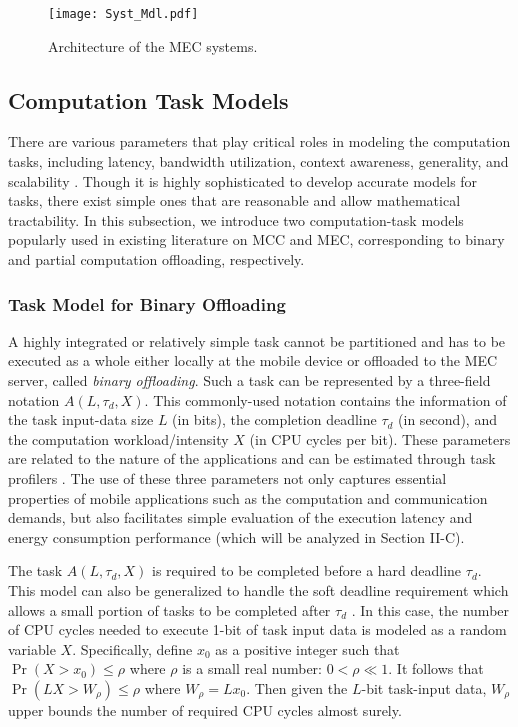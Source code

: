 \documentclass[journal]{IEEEtran}
\begin{document}
\begin{figure*}[!t]
\begin{center}
   \texttt{[image: Syst\_Mdl.pdf]}
\end{center}
\caption{Architecture of the MEC systems.}
\label{Syst_Mdl}
\end{figure*}


\subsection{Computation Task Models}

There are various parameters that play critical roles in modeling the computation tasks, including latency, bandwidth utilization, context awareness, generality, and scalability \cite{KhanAppModels}.  Though it is highly sophisticated to develop accurate models for tasks, there exist simple ones that are  reasonable and allow  mathematical tractability. In  this subsection, we introduce two computation-task models  popularly  used in existing literature on MCC and MEC, corresponding to  binary and partial computation offloading, respectively.

\subsubsection{\textbf{Task Model for Binary Offloading}}
A highly integrated or relatively simple task cannot be partitioned and has to be executed as a whole either  locally at  the mobile device or offloaded to the MEC server, called \emph{binary offloading}. Such a task can be  represented by a three-field notation $A\left(L,\tau_d,X\right)$. This commonly-used notation contains the information of the task input-data size $L$ (in bits), the completion deadline $\tau_{d}$ (in second), and the computation workload/intensity $X$ (in CPU cycles per bit). These parameters are related to the nature of the applications and can be estimated through  task profilers \cite{MiettinenHotCloud1006,SMelendez16}. The use of these three parameters not only captures essential properties of  mobile applications such as the computation and communication demands, but also facilitates simple evaluation of the execution latency and energy consumption performance (which will be analyzed in Section II-C).

The task $A\left(L,\tau_d,X\right)$ is required to be completed before a hard deadline $\tau_d$. This model can also be generalized to handle  the soft deadline requirement which allows a small portion of tasks to be completed after $\tau_d$ \cite{WYuan0310}. In this case, the number of CPU cycles needed to execute 1-bit of task input data is modeled as a random variable $X$. Specifically, define $x_0$ as a positive integer such that $\Pr(X >x _0) \leq \rho$ where $\rho$ is a small real number: $0 < \rho \ll 1$. It follows that $\Pr(LX > W_{\rho})\leq \rho$ where $W_{\rho} = L x_0$. Then given the $L$-bit task-input data, $W_{\rho}$ upper bounds the number of required CPU cycles almost surely.
\end{document}
